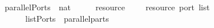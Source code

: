 \isamarkupfalse%
\ parallelPorts\ {\isacharcolon}{\isacharcolon}\ {\isachardoublequoteopen}nat\ {\isasymRightarrow}\ \ {\isasymRightarrow}\ {\isacharparenleft}\ \ resource\ {\isasymRightarrow}\ {\isacharparenleft}\ {\isacharparenleft}\ \ resource{\isacharparenright}\ port\ list{\isachardoublequoteclose}\isanewline
\ \ \ {\isachardoublequoteopen}\ \ {\isacharequal}\ listPorts\ \ {\isacharparenleft}parallel{\isacharunderscore}parts\ 
